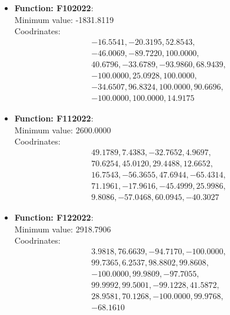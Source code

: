 \documentclass{article}
\begin{document}
\begin{itemize}
  \item \textbf{Function: F102022}: \\
    Minimum value: -1831.8119 \\
    Coodrinates:
    \[
      \begin{aligned}
        & -16.5541, -20.3195, 52.8543, \\
        & -46.0069, -89.7220, 100.0000, \\
        & 40.6796, -33.6789, -93.9860, 68.9439, \\
        & -100.0000, 25.0928, 100.0000, \\
        & -34.6507, 96.8324, 100.0000, 90.6696, \\
        & -100.0000, 100.0000, 14.9175
      \end{aligned}
    \]

  \item \textbf{Function: F112022}: \\
    Minimum value: 2600.0000 \\
    Coodrinates:
    \[
      \begin{aligned}
        & 49.1789, 7.4383, -32.7652, 4.9697, \\
        & 70.6254, 45.0120, 29.4488, 12.6652, \\
        & 16.7543, -56.3655, 47.6944, -65.4314, \\
        & 71.1961, -17.9616, -45.4999, 25.9986, \\
        & 9.8086, -57.0468, 60.0945, -40.3027
      \end{aligned}
    \]

  \item \textbf{Function: F122022}: \\
    Minimum value: 2918.7906 \\
    Coodrinates:
    \[
      \begin{aligned}
        & 3.9818, 76.6639, -94.7170, -100.0000, \\
        & 99.7365, 6.2537, 98.8802, 99.8608,    \\
        & -100.0000, 99.9809, -97.7055,         \\
        & 99.9992, 99.5001, -99.1228, 41.5872,  \\
        & 28.9581, 70.1268, -100.0000, 99.9768, \\
        & -68.1610
      \end{aligned}
    \]

\end{itemize}

\printbibliography[heading=bibintoc, title={References}]
\end{document}
